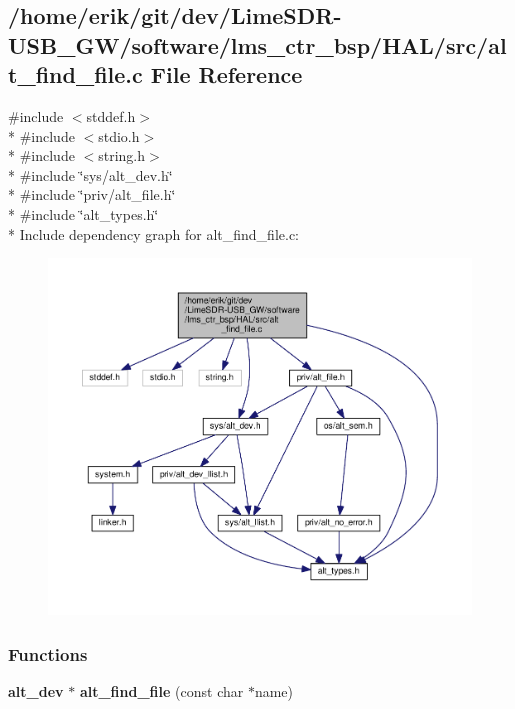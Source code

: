 \subsection{/home/erik/git/dev/\+Lime\+S\+D\+R-\/\+U\+S\+B\+\_\+\+G\+W/software/lms\+\_\+ctr\+\_\+bsp/\+H\+A\+L/src/alt\+\_\+find\+\_\+file.c File Reference}
\label{alt__find__file_8c}
{\ttfamily \#include $<$stddef.\+h$>$}\\*
{\ttfamily \#include $<$stdio.\+h$>$}\\*
{\ttfamily \#include $<$string.\+h$>$}\\*
{\ttfamily \#include \char`\"{}sys/alt\+\_\+dev.\+h\char`\"{}}\\*
{\ttfamily \#include \char`\"{}priv/alt\+\_\+file.\+h\char`\"{}}\\*
{\ttfamily \#include \char`\"{}alt\+\_\+types.\+h\char`\"{}}\\*
Include dependency graph for alt\+\_\+find\+\_\+file.\+c\+:
\nopagebreak
\begin{figure}[H]
\begin{center}
\leavevmode
\includegraphics[width=350pt]{dd/d99/alt__find__file_8c__incl}
\end{center}
\end{figure}
\subsubsection*{Functions}
\begin{DoxyCompactItemize}
\item 
{\bf alt\+\_\+dev} $\ast$ {\bf alt\+\_\+find\+\_\+file} (const char $\ast$name)
\end{DoxyCompactItemize}


